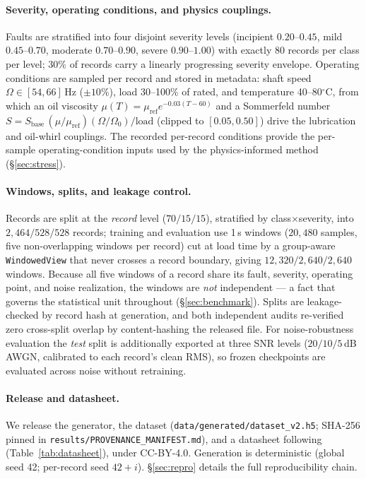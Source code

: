 \documentclass{article}
\begin{document}
\paragraph{Severity, operating conditions, and physics couplings.}
Faults are stratified into four disjoint severity levels (incipient
$0.20$--$0.45$, mild $0.45$--$0.70$, moderate $0.70$--$0.90$, severe
$0.90$--$1.00$) with exactly 80 records per class per level; 30\% of records
carry a linearly progressing severity envelope. Operating conditions are sampled
per record and stored in metadata: shaft speed $\Omega\in[54,66]$\,Hz
($\pm 10\%$), load 30--100\% of rated, and temperature 40--80$^\circ$C, from
which an oil viscosity $\mu(T)=\mu_{\mathrm{ref}}e^{-0.03(T-60)}$ and a
Sommerfeld number
$S=S_{\mathrm{base}}\,(\mu/\mu_{\mathrm{ref}})(\Omega/\Omega_0)/\mathrm{load}$
(clipped to $[0.05,0.50]$) drive the lubrication and oil-whirl couplings. The
recorded per-record conditions provide the per-sample operating-condition inputs
used by the physics-informed method (\S\ref{sec:stress}).

\paragraph{Windows, splits, and leakage control.}
Records are split at the \emph{record} level ($70/15/15$), stratified by
class$\times$severity, into $2{,}464 / 528 / 528$ records; training and
evaluation use 1\,s windows ($20{,}480$ samples, five non-overlapping windows
per record) cut at load time by a group-aware \texttt{WindowedView} that never
crosses a record boundary, giving $12{,}320 / 2{,}640 / 2{,}640$ windows. Because
all five windows of a record share its fault, severity, operating point, and
noise realization, the windows are \emph{not} independent --- a fact that
governs the statistical unit throughout (\S\ref{sec:benchmark}). Splits are
leakage-checked by record hash at generation, and both independent audits
re-verified zero cross-split overlap by content-hashing the released file. For
noise-robustness evaluation the \emph{test} split is additionally exported at
three SNR levels ($20/10/5$\,dB AWGN, calibrated to each record's clean RMS), so
frozen checkpoints are evaluated across noise without retraining.

\paragraph{Release and datasheet.}
We release the generator, the dataset
(\texttt{data/generated/dataset\_v2.h5}; SHA-256 pinned in
\texttt{results/PROVENANCE\_MANIFEST.md}), and a datasheet following
\citet{gebru2021datasheets} (Table~\ref{tab:datasheet}), under CC-BY-4.0.
Generation is deterministic (global seed 42; per-record seed $42+i$).
\S\ref{sec:repro} details the full reproducibility chain.
\end{document}
